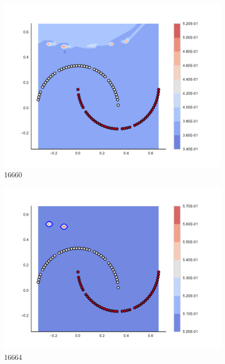 \begin{subfigure}[b]{0.09\textwidth}
    \includegraphics[clip, trim=2.35cm 1.75cm 4.5cm 0cm,width=\textwidth]{img/convergence/16660.pdf}
    \caption{16660}
    \label{fig:convergence_16660}
\end{subfigure}
%
\begin{subfigure}[b]{0.09\textwidth}
    \includegraphics[clip, trim=2.35cm 1.75cm 4.5cm 0cm,width=\textwidth]{img/convergence/16664.pdf}
    \caption{16664}
    \label{fig:convergence_16664}
\end{subfigure}
%

